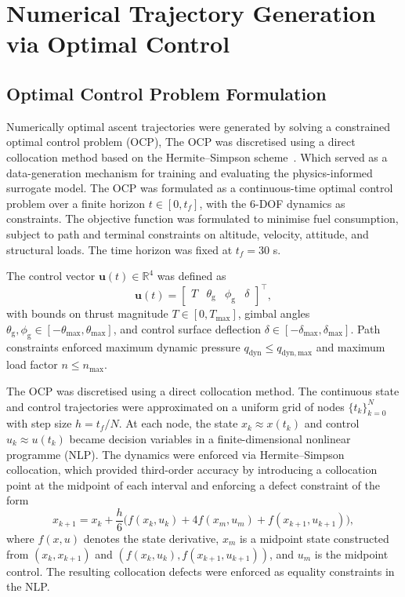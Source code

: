 \section{Numerical Trajectory Generation via Optimal Control}

\subsection{Optimal Control Problem Formulation}

Numerically optimal ascent trajectories were generated by solving a constrained 
optimal control problem (OCP), The OCP was discretised using a direct collocation
method based on the Hermite–Simpson scheme~\cite{betts2010,ross2004}. Which served 
as a data-generation mechanism for training and evaluating the physics-informed 
surrogate model. The OCP was formulated as a continuous-time optimal control problem 
over a finite horizon \(t \in [0, t_f]\), with the 6-DOF dynamics as constraints. 
The objective function was formulated to minimise fuel consumption, subject to path 
and terminal constraints on altitude, velocity, attitude, and structural loads. The 
time horizon was fixed at \(t_f = 30\) s.

The control vector \(\mathbf{u}(t) \in \mathbb{R}^4\) was defined as
\[
  \mathbf{u}(t) =
  \begin{bmatrix}
    T &
    \theta_\mathrm{g} &
    \phi_\mathrm{g} &
    \delta
  \end{bmatrix}^\top ,
\]
with bounds on thrust magnitude \(T \in [0, T_\mathrm{max}]\), gimbal angles
\(\theta_\mathrm{g}, \phi_\mathrm{g} \in [-\theta_\mathrm{max},
\theta_\mathrm{max}]\), and control surface deflection \(\delta \in
[-\delta_\mathrm{max}, \delta_\mathrm{max}]\). Path constraints enforced maximum
dynamic pressure \(q_\mathrm{dyn} \leq q_\mathrm{dyn,max}\) and maximum load
factor \(n \leq n_\mathrm{max}\).

The OCP was discretised using a direct collocation method. The continuous state
and control trajectories were approximated on a uniform grid of nodes
\(\{t_k\}_{k=0}^N\) with step size \(h = t_f/N\). At each node, the state
\(x_k \approx x(t_k)\) and control \(u_k \approx u(t_k)\) became decision
variables in a finite-dimensional nonlinear programme (NLP). The dynamics were
enforced via Hermite--Simpson collocation, which provided third-order accuracy
by introducing a collocation point at the midpoint of each interval and enforcing
a defect constraint of the form
\[
  x_{k+1}
  = x_k + \frac{h}{6}
    \bigl(
      f(x_k, u_k) + 4 f(x_m, u_m) + f(x_{k+1}, u_{k+1})
    \bigr),
\]
where \(f(x,u)\) denotes the state derivative, \(x_m\) is a midpoint state
constructed from \((x_k,x_{k+1})\) and \((f(x_k,u_k), f(x_{k+1},u_{k+1}))\), and
\(u_m\) is the midpoint control. The resulting collocation defects were enforced
as equality constraints in the NLP.

